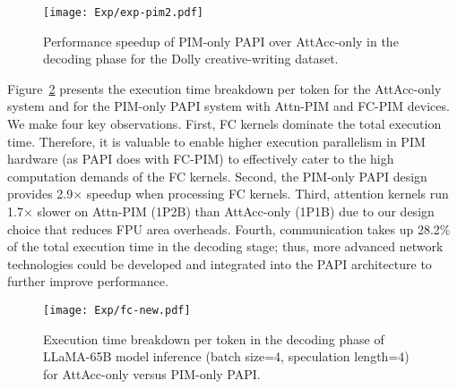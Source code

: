 \begin{figure}[h]
\centering
\texttt{[image: Exp/exp-pim2.pdf]}
\caption{Performance speedup of PIM-only PAPI over AttAcc-only in the decoding phase for the Dolly creative-writing dataset.}
\label{exp:pim}
\end{figure}

Figure~\ref{exp:breakdown} presents the execution time breakdown per token for the AttAcc-only system and for the PIM-only PAPI system with Attn-PIM and FC-PIM devices. We make four key observations.
First, FC kernels dominate the total execution time.
Therefore, it is valuable to enable higher execution parallelism in PIM hardware (as PAPI does with FC-PIM) to effectively cater to the high computation demands of the FC kernels. 
Second, the PIM-only PAPI design provides 2.9× speedup when processing FC kernels.
Third, attention kernels run 1.7× slower on Attn-PIM (1P2B) than AttAcc-only (1P1B) due to our design choice that reduces FPU area overheads.
Fourth, communication takes up 28.2\% of the total execution time in the decoding stage; thus, more advanced network technologies could be developed and integrated into the PAPI architecture to further improve performance. 

\begin{figure}[h]
\centering
\texttt{[image: Exp/fc-new.pdf]}
\caption{Execution time breakdown per token in the decoding phase of LLaMA-65B model inference (batch size=4, speculation length=4) for AttAcc-only versus PIM-only PAPI.}
\label{exp:breakdown}

\end{figure}
